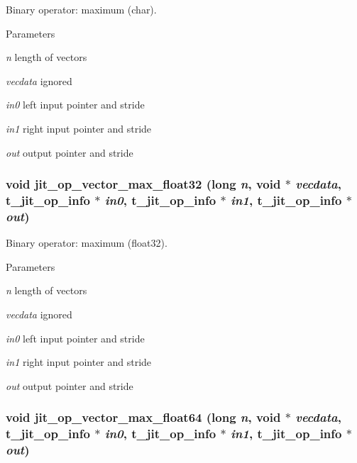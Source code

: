 Binary operator: maximum (char). 
\begin{DoxyParams}{Parameters}
\item[{\em n}]length of vectors \item[{\em vecdata}]ignored \item[{\em in0}]left input pointer and stride \item[{\em in1}]right input pointer and stride \item[{\em out}]output pointer and stride \end{DoxyParams}
\hypertarget{group__opvecmod_ga69741058015d7aa7ec0c0874e3b20192}{
\subsubsection[{jit\_\-op\_\-vector\_\-max\_\-float32}]{\setlength{\rightskip}{0pt plus 5cm}void jit\_\-op\_\-vector\_\-max\_\-float32 (long {\em n}, \/  void $\ast$ {\em vecdata}, \/  {\bf t\_\-jit\_\-op\_\-info} $\ast$ {\em in0}, \/  {\bf t\_\-jit\_\-op\_\-info} $\ast$ {\em in1}, \/  {\bf t\_\-jit\_\-op\_\-info} $\ast$ {\em out})}}
\label{group__opvecmod_ga69741058015d7aa7ec0c0874e3b20192}


Binary operator: maximum (float32). 
\begin{DoxyParams}{Parameters}
\item[{\em n}]length of vectors \item[{\em vecdata}]ignored \item[{\em in0}]left input pointer and stride \item[{\em in1}]right input pointer and stride \item[{\em out}]output pointer and stride \end{DoxyParams}
\hypertarget{group__opvecmod_ga7faee9edbbe6f5583f4c38ff39ddb5de}{
\subsubsection[{jit\_\-op\_\-vector\_\-max\_\-float64}]{\setlength{\rightskip}{0pt plus 5cm}void jit\_\-op\_\-vector\_\-max\_\-float64 (long {\em n}, \/  void $\ast$ {\em vecdata}, \/  {\bf t\_\-jit\_\-op\_\-info} $\ast$ {\em in0}, \/  {\bf t\_\-jit\_\-op\_\-info} $\ast$ {\em in1}, \/  {\bf t\_\-jit\_\-op\_\-info} $\ast$ {\em out})}}
\label{group__opvecmod_ga7faee9edbbe6f5583f4c38ff39ddb5de}


